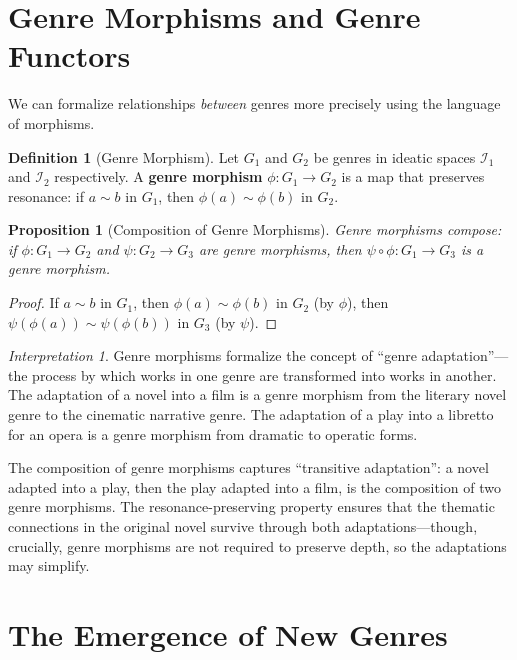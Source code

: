 \documentclass[11pt,openany]{book}
\theoremstyle{definition}
\newtheorem{definition}[axiom]{Definition}
\theoremstyle{plain}
\newtheorem{proposition}[axiom]{Proposition}
\theoremstyle{remark}
\newtheorem{interpretation}[axiom]{Interpretation}
\newcommand{\IS}{\mathcal{I}}               %
\newcommand{\res}{\sim}                      %
\begin{document}
\section{Genre Morphisms and Genre Functors}

We can formalize relationships \emph{between} genres more precisely using the language of morphisms.

\begin{definition}[Genre Morphism]
Let $G_1$ and $G_2$ be genres in ideatic spaces $\IS_1$ and $\IS_2$ respectively. A \textbf{genre morphism} $\phi : G_1 \to G_2$ is a map that preserves resonance: if $a \res b$ in $G_1$, then $\phi(a) \res \phi(b)$ in $G_2$.
\end{definition}

\begin{proposition}[Composition of Genre Morphisms]
Genre morphisms compose: if $\phi : G_1 \to G_2$ and $\psi : G_2 \to G_3$ are genre morphisms, then $\psi \circ \phi : G_1 \to G_3$ is a genre morphism.
\end{proposition}

\begin{proof}
If $a \res b$ in $G_1$, then $\phi(a) \res \phi(b)$ in $G_2$ (by $\phi$), then $\psi(\phi(a)) \res \psi(\phi(b))$ in $G_3$ (by $\psi$).
\end{proof}

\begin{interpretation}
Genre morphisms formalize the concept of ``genre adaptation''---the process by which works in one genre are transformed into works in another. The adaptation of a novel into a film is a genre morphism from the literary novel genre to the cinematic narrative genre. The adaptation of a play into a libretto for an opera is a genre morphism from dramatic to operatic forms.

The composition of genre morphisms captures ``transitive adaptation'': a novel adapted into a play, then the play adapted into a film, is the composition of two genre morphisms. The resonance-preserving property ensures that the thematic connections in the original novel survive through both adaptations---though, crucially, genre morphisms are not required to preserve depth, so the adaptations may simplify.
\end{interpretation}

\section{The Emergence of New Genres}
\end{document}
